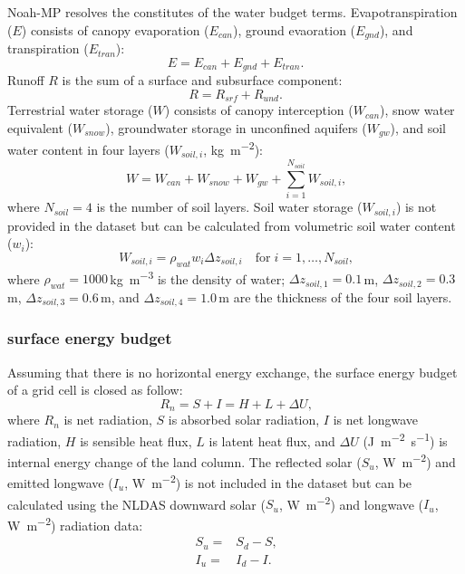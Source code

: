 \documentclass[essd]{copernicus}
\begin{document}
Noah-MP resolves the constitutes of the water budget terms. Evapotranspiration ($E$) consists of canopy evaporation ($E_{can}$), ground evaoration ($E_{gnd}$), and transpiration ($E_{tran}$):
\begin{equation}
    E = E_{can} + E_{gnd} + E_{tran} \text{.}
\end{equation}
Runoff {$R$} is the sum of a surface and subsurface component:
\begin{equation}
    R = R_{srf} + R_{und} \text{.}
\end{equation}
Terrestrial water storage ($W$) consists of canopy interception ($W_{can}$), snow water equivalent ($W_{snow}$), groundwater storage in unconfined aquifers ($W_{gw}$), and soil water content in four layers ($W_{soil,i}$,
\unit{kg~m^{-2}}):
\begin{equation}
    W = W_{can} + W_{snow} + W_{gw} + \sum_{i=1}^{N_{soil}} W_{soil,i} \text{,}
\end{equation}
where $N_{soil} = 4$ is the number of soil layers.  Soil water storage ($W_{soil,i}$) is not provided in the dataset but can be calculated from volumetric soil water content ($w_{i}$):
\begin{equation}
    W_{soil,i} = \rho_{wat} w_i \Delta z_{soil,i}
    \quad \text{for} \; i = 1,\dots,N_{soil}
    \text{,} \label{eq:soil-vmc}
\end{equation}
where $\rho_{wat}=1000$\,\unit{kg~m^{-3}} is the density of water; $\Delta z_{soil,1}=0.1$\,\unit{m}, $\Delta z_{soil,2}=0.3$\,\unit{m}, $\Delta z_{soil,3}=0.6$\,\unit{m}, and $\Delta z_{soil,4}=1.0$\,\unit{m} are the thickness of the four soil layers.

\subsubsection{surface energy budget}

Assuming that there is no horizontal energy exchange, the surface energy budget of a grid cell is closed as follow:
\begin{equation}
    R_n = S + I = H + L + \Delta U \text{,} \label{eq:energy-balance}
\end{equation}
where $R_n$ is net radiation, $S$ is absorbed solar radiation, $I$ is net longwave radiation, $H$ is sensible heat flux, $L$ is latent heat flux, and $\Delta U$ (\unit{J~m^{-2}~s^{-1}}) is internal energy change of the land column. The reflected solar ($S_u$, \unit{W~m^{-2}}) and emitted longwave ($I_u$, \unit{W~m^{-2}}) is not included in the dataset but can be calculated using the NLDAS downward solar ($S_u$, \unit{W~m^{-2}}) and
longwave ($I_u$, \unit{W~m^{-2}}) radiation data:
\begin{align}
    S_u = & S_d - S \text{,} \\
    I_u = & I_d - I \text{.}
\end{align}
\end{document}
